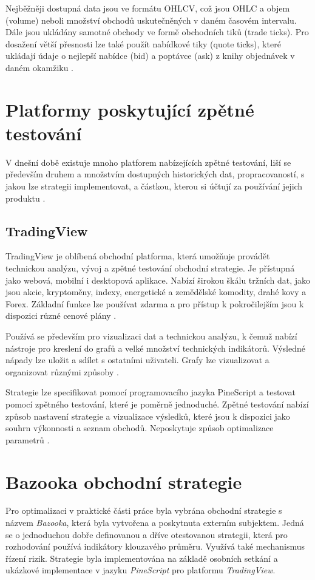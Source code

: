 Nejběžněji dostupná data jsou ve formátu OHLCV, což jsou OHLC a objem (volume) neboli množství obchodů uskutečněných v daném časovém intervalu.
Dále jsou ukládány samotné obchody ve formě obchodních tiků (trade ticks).
Pro dosažení větší přesnosti lze také použít nabídkové tiky (quote ticks), které ukládají údaje o nejlepší nabídce (bid) a poptávce (ask) z knihy objednávek v daném okamžiku \cite{polygon}.

\section{Platformy poskytující zpětné testování}
V dnešní době existuje mnoho platforem nabízejících zpětné testování, liší se především druhem a množstvím dostupných historických dat, propracovaností, s jakou lze strategii implementovat, a částkou, kterou si účtují za používání jejich produktu \cite{bowman}.

\subsection{TradingView}
TradingView je oblíbená obchodní platforma, která umožňuje provádět technickou analýzu, vývoj a zpětné testování obchodní strategie.
Je přístupná jako webová, mobilní i desktopová aplikace. 
Nabízí širokou škálu tržních dat, jako jsou akcie, kryptoměny, indexy, energetické a zemědělské komodity, drahé kovy a Forex.
Základní funkce lze používat zdarma a pro přístup k pokročilejším jsou k dispozici různé cenové plány \cite{bowman}.

Používá se především pro vizualizaci dat a technickou analýzu, k čemuž nabízí nástroje pro kreslení do grafů a velké množství technických indikátorů.
Výsledné nápady lze uložit a sdílet s ostatními uživateli.
Grafy lze vizualizovat a organizovat různými způsoby \cite{tradingview}.

Strategie lze specifikovat pomocí programovacího jazyka PineScript a testovat pomocí zpětného testování, které je poměrně jednoduché.
Zpětné testování nabízí způsob nastavení strategie a vizualizace výsledků, které jsou k dispozici jako souhrn výkonnosti a seznam obchodů.
Neposkytuje způsob optimalizace parametrů \cite{tradingview}.

\section{Bazooka obchodní strategie}
Pro optimalizaci v praktické části práce byla vybrána obchodní strategie s názvem \textit{Bazooka}, která byla vytvořena a poskytnuta externím subjektem.
Jedná se o jednoduchou dobře definovanou a dříve otestovanou strategii, která pro rozhodování používá indikátory klouzavého průměru.
Využívá také mechanismus řízení rizik.
Strategie byla implementována na základě osobních setkání a ukázkové implementace v jazyku \textit{PineScript} pro platformu \textit{TradingView}.

